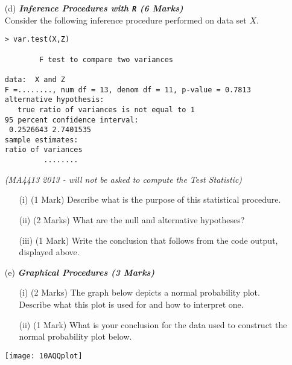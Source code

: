 
%
\newpage
\begin{itemize}
\item[(d)] \textbf{\textit{ Inference Procedures with \texttt{R} (6 Marks)}}\\
Consider the following inference procedure performed on data set $X$.
\begin{center}
\begin{framed}
\begin{verbatim}
> var.test(X,Z)

        F test to compare two variances

data:  X and Z 
F =........, num df = 13, denom df = 11, p-value = 0.7813
alternative hypothesis: 
   true ratio of variances is not equal to 1 
95 percent confidence interval:
 0.2526643 2.7401535 
sample estimates:
ratio of variances 
         ........

\end{verbatim}
\end{framed}
\end{center}
\textit{(MA4413 2013 - will not be asked to compute the Test Statistic)}
\begin{itemize}
\item[(i)] (1 Mark) Describe what is the purpose of this statistical procedure.
\item[(ii)] (2 Marks) What are the null and alternative hypotheses?
\item[(iii)] (1 Mark) Write the conclusion that follows from the code output, displayed above.
\end{itemize}
\end{itemize}

\begin{itemize}
\item[(e)] \textbf{\textit{Graphical Procedures (3 Marks)}}
\begin{itemize}
\item[(i)] (2 Marks) The graph below depicts a normal probability plot. Describe what this plot is used for and how to interpret one.
\item[(ii)](1 Mark) What is your conclusion for the data used to construct the normal probability plot below.
\end{itemize}
\begin{center}
\texttt{[image: 10AQQplot]}
\end{center}
\end{itemize}
